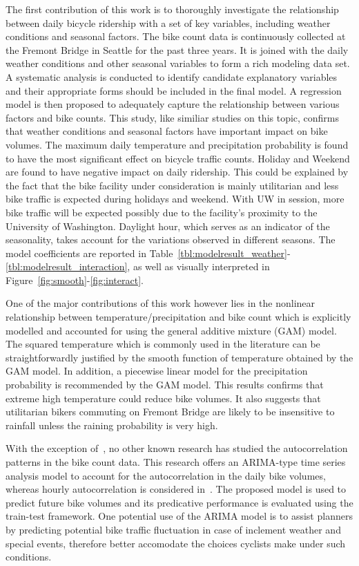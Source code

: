 \documentclass [11pt, proquest] {uwthesis}[2015/03/03]
\begin{document}
The first contribution of this work is to thoroughly investigate the relationship between daily bicycle ridership with a set of key variables, including weather conditions and seasonal factors. The bike count data is continuously collected at the Fremont Bridge in Seattle for the past three years. It is joined with the daily weather conditions and other seasonal variables to form a rich modeling data set. A systematic analysis is conducted to identify candidate explanatory variables and their appropriate forms should be included in the final model. A regression model is then proposed to adequately capture the relationship between various factors and bike counts. This study, like similiar studies on this topic, confirms that weather conditions and seasonal factors have important impact on bike volumes. The maximum daily temperature and precipitation probability is found to have the most significant effect on bicycle traffic counts. Holiday and Weekend are found to have negative impact on daily ridership. This could be explained by the fact that the bike facility under consideration is mainly utilitarian and less bike traffic is expected during holidays and weekend. With UW in session, more bike traffic will be expected possibly due to the facility's proximity to the University of Washington. Daylight hour, which serves as an indicator of the seasonality, takes account for the variations observed in different seasons. The model coefficients are reported in Table~\ref{tbl:modelresult_weather}-\ref{tbl:modelresult_interaction}, as well as visually interpreted in Figure~\ref{fig:smooth}-\ref{fig:interact}.

One of the major contributions of this work however lies in the nonlinear relationship between temperature/precipitation and bike count which is explicitly modelled and accounted for using the general additive mixture (GAM) model. The squared temperature which is commonly used in the literature can be straightforwardly justified by the smooth function of temperature obtained by the GAM model. In addition, a piecewise linear model for the precipitation probability is recommended by the GAM model. This results confirms that extreme high temperature could reduce bike volumes. It also suggests that utilitarian bikers commuting on Fremont Bridge are likely to be insensitive to rainfall unless the raining probability is very high.

With the exception of~\cite{Gallop:2012aa,Nosal:2014aa}, no other known research has studied the autocorrelation patterns in the bike count data. This research offers an ARIMA-type time series analysis model to account for the autocorrelation in the daily bike volumes, whereas hourly autocorrelation is considered in~\cite{Gallop:2012aa,Nosal:2014aa}. The proposed model is used to predict future bike volumes and its predicative performance is evaluated using the train-test framework. One potential use of the ARIMA model is to assist planners by predicting potential bike traffic fluctuation in case of inclement weather and special events, therefore better accomodate the choices cyclists make under such conditions. 
\end{document}
